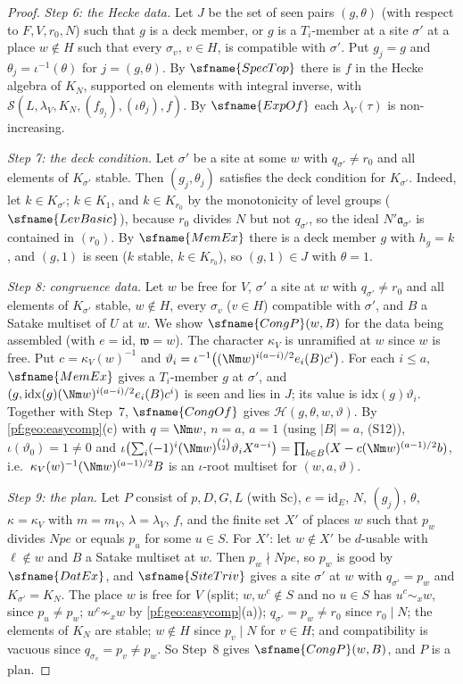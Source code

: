 \begin{proof}
\emph{Step 6: the Hecke data.} Let $J$ be the set of seen pairs $(g,\theta)$ (with respect to $F,V,r_0,N$) such that $g$ is a deck member,
or $g$ is a $T_i$-member at a site $\sigma'$ at a place $w\notin H$ such that every $\sigma_v$, $v\in H$, is compatible with $\sigma'$. Put
$g_j=g$ and $\theta_j=\iota^{-1}(\theta)$ for $j=(g,\theta)$. By $\sfname{SpecTop}$ there is $f$ in the Hecke algebra of $K_N$, supported on
elements with integral inverse, with $\mathcal S(L,\lambda_V,K_N,(f_{g_j}),(\iota\theta_j),f)$. By $\sfname{ExpOf}$ each $\lambda_V(\tau)$ is
non-increasing.

\emph{Step 7: the deck condition.} Let $\sigma'$ be a site at some $w$ with $q_{\sigma'}\ne r_0$ and all elements of $K_{\sigma'}$ stable. Then
$(g_j,\theta_j)$ satisfies the deck condition for $K_{\sigma'}$. Indeed, let $k\in K_{\sigma'}$; $k\in K_1$, and $k\in K_{r_0}$ by the monotonicity
of level groups ($\sfname{LevBasic}$), because $r_0$ divides $N$ but not $q_{\sigma'}$, so the ideal $N'\mathfrak a_{\sigma'}$ is contained in $(r_0)$. By
$\sfname{MemEx}$ there is a deck member $g$ with $h_g=k$, and $(g,1)$ is seen ($k$ stable, $k\in K_{r_0}$), so $(g,1)\in J$ with $\theta=1$.

\emph{Step 8: congruence data.} Let $w$ be free for $V$, $\sigma'$ a site at $w$ with $q_{\sigma'}\ne r_0$ and all elements of $K_{\sigma'}$
stable, $w\notin H$, every $\sigma_v$ ($v\in H$) compatible with $\sigma'$, and $B$ a Satake multiset of $U$ at $w$. We show
$\sfname{CongP}(w,B)$ for the data being assembled (with $e=\mathrm{id}$, $\mathfrak w=w$). The character $\kappa_V$ is unramified at $w$ since $w$
is free. Put $c=\kappa_V(w)^{-1}$ and $\vartheta_i=\iota^{-1}\bigl((\Nm w)^{i(a-i)/2}e_i(B)c^i\bigr)$. For each $i\le a$, $\sfname{MemEx}$ gives a
$T_i$-member $g$ at $\sigma'$, and $(g,\mathrm{idx}(g)(\Nm w)^{i(a-i)/2}e_i(B)c^i)$ is seen and lies in $J$; its value is $\mathrm{idx}(g)\vartheta_i$.
Together with Step~7, $\sfname{CongOf}$ gives $\mathcal H(g,\theta,w,\vartheta)$. By \cref{pf:geo:easycomp}(c) with $q=\Nm w$, $n=a$, $a=1$
(using $|B|=a$, (S12)), $\iota(\vartheta_0)=1\ne0$ and
$\iota\bigl(\sum_i(-1)^i(\Nm w)^{\binom i2}\vartheta_iX^{a-i}\bigr)=\prod_{b\in B}(X-c(\Nm w)^{(a-1)/2}b)$, i.e.\ $\kappa_V(w)^{-1}(\Nm w)^{(a-1)/2}B$ is an
$\iota$-root multiset for $(w,a,\vartheta)$.

\emph{Step 9: the plan.} Let $P$ consist of $p,D,G,L$ (with $\mathrm{Sc}$), $e=\mathrm{id}_E$, $N$, $(g_j)$, $\theta$, $\kappa=\kappa_V$ with $m=m_V$,
$\lambda=\lambda_V$, $f$, and the finite set $X'$ of places $w$ such that $p_w$ divides $Npe$ or equals $p_u$ for some $u\in S$. For $X'$: let
$w\notin X'$ be $d$-usable with $\ell\notin w$ and $B$ a Satake multiset at $w$. Then $p_w\nmid Npe$, so $p_w$ is good by $\sfname{DatEx}$, and
$\sfname{SiteTriv}$ gives a site $\sigma'$ at $w$ with $q_{\sigma'}=p_w$ and $K_{\sigma'}=K_N$. The place $w$ is free for $V$ (split; $w,w^c\notin S$ and
no $u\in S$ has $u^c\sim_xw$, since $p_u\ne p_w$; $w^c\not\sim_xw$ by \cref{pf:geo:easycomp}(a)); $q_{\sigma'}=p_w\ne r_0$ since $r_0\mid N$; the
elements of $K_N$ are stable; $w\notin H$ since $p_v\mid N$ for $v\in H$; and compatibility is vacuous since $q_{\sigma_v}=p_v\ne p_w$. So Step~8
gives $\sfname{CongP}(w,B)$, and $P$ is a plan.


\end{proof}
